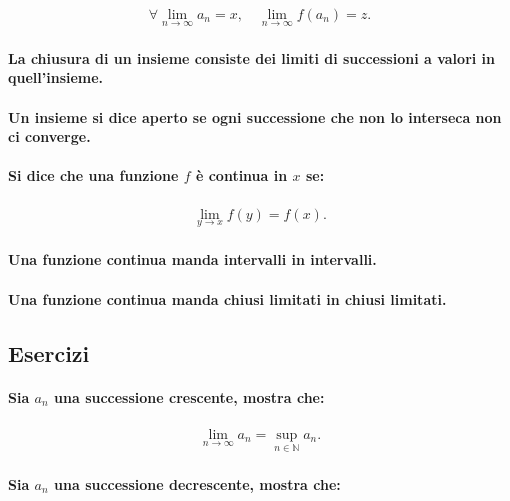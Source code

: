 \documentclass{article}
\begin{document}
\begin{align*}
\forall \lim_{n \rightarrow \infty} a_n = x, \quad \lim_{n \rightarrow \infty} f(a_n) = z.
\end{align*}

\paragraph{La chiusura di un insieme consiste dei limiti di successioni a valori in quell'insieme.}

\paragraph{Un insieme si dice aperto se ogni successione che non lo interseca non ci converge.}

\paragraph{Si dice che una funzione $f$ è continua in $x$ se:}

\begin{align*}
\lim_{y \rightarrow x} f(y) = f(x).
\end{align*}

\paragraph{Una funzione continua manda intervalli in intervalli.}

\paragraph{Una funzione continua manda chiusi limitati in chiusi limitati.}

\subsection*{Esercizi}

\paragraph{Sia $a_n$ una successione crescente, mostra che:}

\begin{align*}
\lim_{n \to \infty} a_n = \sup_{n \in {\mathbb N}} a_n.
\end{align*}

\paragraph{Sia $a_n$ una successione decrescente, mostra che:}
\end{document}
